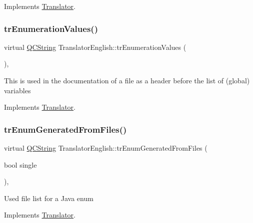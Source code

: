 Implements \mbox{\hyperlink{class_translator}{Translator}}.

\mbox{\label{class_translator_english_a737dc2483e90bddb8bf3ae0ef68239e0}} 
\subsubsection{\texorpdfstring{trEnumerationValues()}{trEnumerationValues()}}
{\footnotesize\ttfamily virtual \mbox{\hyperlink{class_q_c_string}{Q\+C\+String}} Translator\+English\+::tr\+Enumeration\+Values (\begin{DoxyParamCaption}{ }\end{DoxyParamCaption})\hspace{0.3cm}{\ttfamily [inline]}, {\ttfamily [virtual]}}

This is used in the documentation of a file as a header before the list of (global) variables 

Implements \mbox{\hyperlink{class_translator}{Translator}}.

\mbox{\label{class_translator_english_a8a733dfbf38ae74d78fde5318f4c4cbc}} 
\subsubsection{\texorpdfstring{trEnumGeneratedFromFiles()}{trEnumGeneratedFromFiles()}}
{\footnotesize\ttfamily virtual \mbox{\hyperlink{class_q_c_string}{Q\+C\+String}} Translator\+English\+::tr\+Enum\+Generated\+From\+Files (\begin{DoxyParamCaption}\item[{bool}]{single }\end{DoxyParamCaption})\hspace{0.3cm}{\ttfamily [inline]}, {\ttfamily [virtual]}}

Used file list for a Java enum 

Implements \mbox{\hyperlink{class_translator}{Translator}}.

\mbox{\label{class_translator_english_a6d505136d193c1a3cbff2bfca935f123}} 
